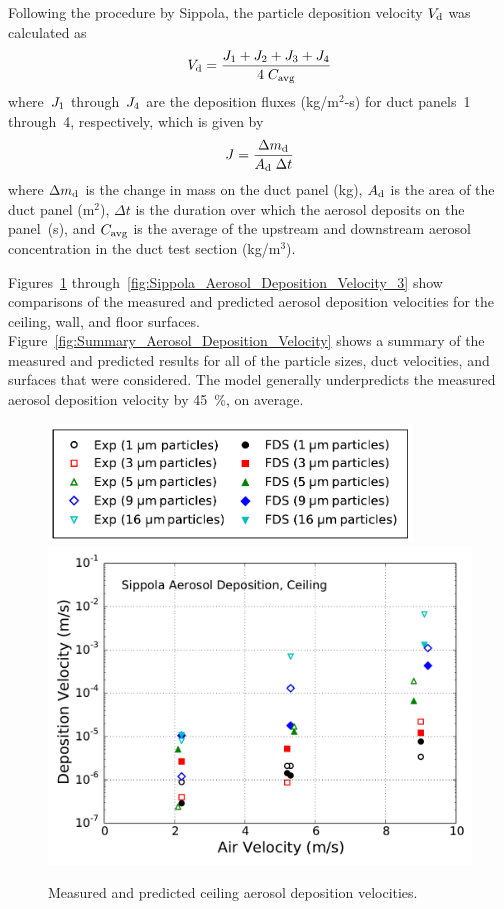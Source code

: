 Following the procedure by Sippola, the particle deposition velocity $V\sb{d}$ was calculated as
\begin{equation}
V\sb{d} = \frac{J\sb{1} + J\sb{2} + J\sb{3} + J\sb{4}}{4 \; C\sb{avg}}
\label{eq:sippola_deposition_velocity}
\end{equation}
where~$J\sb{1}$ through~$J\sb{4}$ are the deposition fluxes (kg/m$^2$-s) for duct panels~1 through~4, respectively, which is given by
\begin{equation}
J = \frac{\Delta m\sb{d}}{A\sb{d} \; \Delta t}
\label{eq:sippola_deposition_flux}
\end{equation}
where $\Delta m\sb{d}$ is the change in mass on the duct panel (kg), $A\sb{d}$ is the area of the duct panel (m$^2$), $\Delta t$ is the duration over which the aerosol deposits on the panel~(s), and $C\sb{avg}$ is the average of the upstream and downstream aerosol concentration in the duct test section (kg/m$^3$).

Figures~\ref{fig:Sippola_Aerosol_Deposition_Velocity_1} through~\ref{fig:Sippola_Aerosol_Deposition_Velocity_3} show comparisons of the measured and predicted aerosol deposition velocities for the ceiling, wall, and floor surfaces. Figure~\ref{fig:Summary_Aerosol_Deposition_Velocity} shows a summary of the measured and predicted results for all of the particle sizes, duct velocities, and surfaces that were considered. The model generally underpredicts the measured aerosol deposition velocity by 45~\%, on average.

\begin{figure}[p]
\includegraphics[width=3.8in]{Fig_Sippola_Aerosol_Deposition_Legend.pdf} \\
\includegraphics[width=5.0in]{Fig_Sippola_Aerosol_Ceiling_Deposition.pdf}
\caption[Ceiling aerosol deposition velocities]
{Measured and predicted ceiling aerosol deposition velocities.}
\label{fig:Sippola_Aerosol_Deposition_Velocity_1}
\end{figure}

